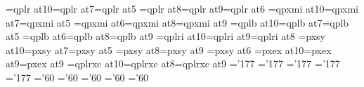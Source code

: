 \ifx\PT\undefined{}\fi
\font\tenrm=qplr at10\PT \font\sevenrm=qplr at7\PT \font\fiverm=qplr at5\PT
\font\eightrm=qplr at8\PT \font\ninerm=qplr at9\PT \font\sixrm=qplr at6\PT
\font\teni=qpxmi at10\PT \font\seveni=qpxmi at7\PT \font\fivei=qpxmi at5\PT
\font\sixi=qpxmi at6\PT  \font\eighti=qpxmi at8\PT \font\ninei=qpxmi at9\PT
\font\tenbf=qplb at10\PT \font\sevenbf=qplb at7\PT \font\fivebf=qplb at5\PT
\font\sixbf=qplb at6\PT  \font\eightbf=qplb at8\PT \font\ninebf=qplb at9\PT
\font\tenit=qplri at10\PT \font\nineit=qplri at9\PT \font\eightit=qplri at8\PT
\font\tensy=pxsy at10\PT \font\sevensy=pxsy at7\PT \font\fivesy=pxsy at5\PT
\font\eightsy=pxsy at8\PT \font\ninesy=pxsy at9\PT
\font\sixsy=pxsy at6\PT
\font\tenex=pxex at10\PT \font\eightex=pxex at9\PT \font\nineex=pxex at9\PT
\font\tencsc=qplrxc at10\PT \font\eightcsc=qplrxc at8\PT \font\ninecsc=qplrxc at9\PT
%
\skewchar\teni='177 \skewchar\ninei='177 \skewchar\eighti='177
\skewchar\seveni='177 \skewchar\fivei='177
\skewchar\tensy='60 \skewchar\ninesy='60 \skewchar\eightsy='60
\skewchar\sevensy='60 \skewchar\fivesy='60
%
\def\eightpoint{\def\rm{\fam0\eightrm}%
\textfont0\eightrm \scriptfont0=\sixrm \scriptscriptfont0=\fiverm
\textfont1\eighti  \scriptfont1=\sixi  \scriptscriptfont1=\fivei
\textfont2\eightsy \scriptfont2=\sixsy   \scriptscriptfont2=\fivesy
\textfont3\eightex \scriptfont3=\eightex \scriptscriptfont3=\eightex
\def\mit{\fam1} \def\oldstyle{\fam1\eighti} \def\cal{\fam2}%
\textfont\itfam=\eightit \def\it{\fam\itfam\eightit}%
\textfont\bffam=\eightbf \scriptfont\bffam=\sixbf\scriptscriptfont\bffam=\fivebf
\def\bf{\fam\bffam\eightbf}%
\let\sc=\eightcsc
\normalbaselineskip=10\PT%
\setbox\strutbox=\hbox{\vrule height7.6\PT depth 2.4\PT width0pt}%
\normalbaselines\rm}
\def\ninepoint{\def\rm{\fam0\ninerm}%
\textfont0=\ninerm \scriptfont0=\sixrm \scriptscriptfont0=\fiverm
\textfont1=\ninei  \scriptfont1=\sixi  \scriptscriptfont1=\fivei
\textfont2=\ninesy \scriptfont2=\sixsy  \scriptscriptfont2=\fivesy
\textfont3=\nineex \scriptfont3=\nineex \scriptscriptfont3=\nineex
\def\mit{\fam1} \def\oldstyle{\fam1\ninei} \def\cal{\fam2}%
\textfont\itfam=\nineit \def\it{\fam\itfam\nineit}%
\textfont\bffam=\ninebf \scriptfont\bffam=\sixbf \scriptscriptfont\bffam=\fivebf
\def\bf{\fam\bffam\ninebf}%
\let\sc=\ninecsc
\normalbaselineskip=11\PT%
\setbox\strutbox=\hbox{\vrule height8\PT depth3\PT width0pt}%
\normalbaselines\rm}
